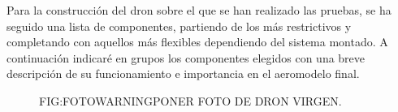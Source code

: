 
 Para la construcción del dron sobre el que se han realizado las pruebas, se ha seguido una lista de componentes, partiendo de los más restrictivos y completando con aquellos más flexibles dependiendo del sistema montado.
 A continuación indicaré en grupos los componentes elegidos con una breve descripción de su funcionamiento e importancia en el aeromodelo final.
 
  \begin{figure}{FIG:FOTOWARNING}{PONER FOTO DE DRON VIRGEN.}
\end{figure}